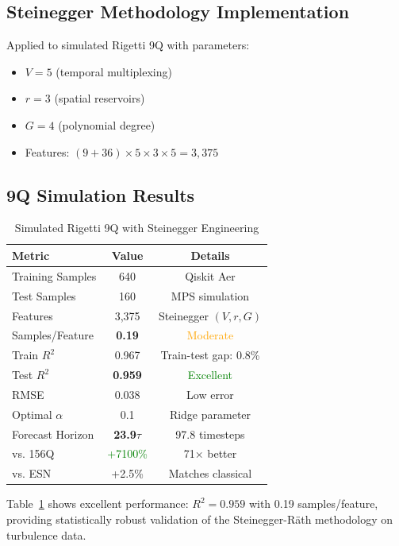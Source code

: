 \documentclass[conference]{IEEEtran}
\begin{document}
\subsection{Steinegger Methodology Implementation}

Applied to simulated Rigetti 9Q with parameters:
\begin{itemize}
    \item $V = 5$ (temporal multiplexing)
    \item $r = 3$ (spatial reservoirs)
    \item $G = 4$ (polynomial degree)
    \item Features: $(9 + 36) \times 5 \times 3 \times 5 = 3,375$
\end{itemize}

\subsection{9Q Simulation Results}

\begin{table}[!htbp]
\centering
\caption{Simulated Rigetti 9Q with Steinegger Engineering}
\label{tab:9q_results}
\begin{tabular}{@{}lcc@{}}
\toprule
\textbf{Metric} & \textbf{Value} & \textbf{Details} \\
\midrule
Training Samples & 640 & Qiskit Aer \\
Test Samples & 160 & MPS simulation \\
Features & 3,375 & Steinegger $(V,r,G)$ \\
Samples/Feature & \textbf{0.19} & \textcolor{orange}{Moderate} \\
\midrule
Train $R^2$ & 0.967 & Train-test gap: 0.8\% \\
Test $R^2$ & \textbf{0.959} & \textcolor{green}{Excellent} \\
RMSE & 0.038 & Low error \\
\midrule
Optimal $\alpha$ & 0.1 & Ridge parameter \\
Forecast Horizon & \textbf{23.9$\tau$} & 97.8 timesteps \\
vs. 156Q & \textcolor{green}{+7100\%} & 71× better \\
vs. ESN & +2.5\% & Matches classical \\
\bottomrule
\end{tabular}
\end{table}

Table~\ref{tab:9q_results} shows excellent performance: $R^2=0.959$ with 0.19 samples/feature, providing statistically robust validation of the Steinegger-Räth methodology on turbulence data.
\end{document}
